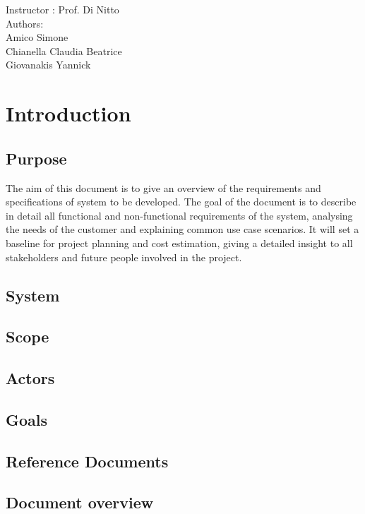 \documentclass[11pt]{article}
\begin{document}
	 \begin{center}
	 	{\Large Instructor : Prof. Di Nitto}
	 	\vspace{5mm}\\	 
	 	{\Large Authors:}\\
	 	{\Large Amico Simone}\\
	 	{\Large Chianella Claudia Beatrice}\\
	 	{\Large Giovanakis Yannick}
	 \end{center}
	 
	 \newpage
	 
	 \tableofcontents{}
	 
	 \newpage
	 
	 \section{\Large Introduction}
	 
	 \subsection{Purpose}
		The aim of this document	is to give an overview of the 	requirements and specifications of system to be developed. 
		The goal of the document is to describe in detail all functional and non-functional requirements of the system, analysing the needs of the customer and explaining common use case scenarios.
		It will set a baseline for project planning and cost estimation, giving a detailed insight to all stakeholders and future people involved in the project.
	 
	 \subsection{System}
	 
	 \subsection{Scope}
	 \subsection{Actors}
	 \subsection{Goals}
	 \subsection{Reference Documents}
	 \subsection{Document overview}




	 	 


	 	
	
	 
     
    
     
	
\end{document}
